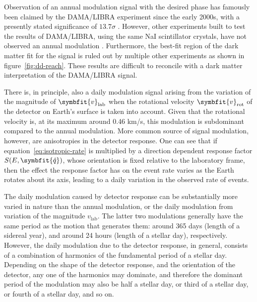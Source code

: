 \documentclass[b5paper, 10pt, twoside]{book}
\renewcommand{\vec}[1]{\symbfit{#1}}
\newcommand{\unitv}[1]{\symbfit{\hat{#1}}}
\begin{document}
Observation of an annual modulation signal with the desired phase has famously been claimed by the DAMA/LIBRA experiment since the early 2000s, with a presently stated significance of $13.7\sigma$ \parencite{BernabeiEtAl2023}. However, other experiments built to test the results of DAMA/LIBRA, using the same NaI scintillator crystals, have not observed an annual modulation \parencites{DMIce2017, COSINE1002019, COSINE1002024, KIMS2019, ANAIS2024}. Furthermore, the best-fit region of the dark matter fit for the signal is ruled out by multiple other experiments as shown in figure~\ref{fig:dd-reach}.  These results are difficult to reconcile with a dark matter interpretation of the DAMA/LIBRA signal.

There is, in principle, also a daily modulation signal arising from the variation of the magnitude of $\vec{v}_\text{lab}$ when the rotational velocity $\vec{v}_\text{rot}$ of the detector on Earth's surface is taken into account. Given that the rotational velocity is, at its maximum around 0.46 km/s, this modulation is subdominant compared to the annual modulation. More common source of signal modulation, however, are anisotropies in the detector response. One can see that if equation~\eqref{eq:isotropic-rate} is multiplied by a direction dependent response factor $S(E,\unitv{q})$, whose orientation is fixed relative to the laboratory frame, then the effect the response factor has on the event rate varies as the Earth rotates about its axis, leading to a daily variation in the observed rate of events.

The daily modulation caused by detector response can be substantially more varied in nature than the annual modulation, or the daily modulation from variation of the magnitude $v_\text{lab}$. The latter two modulations generally have the same period as the motion that generates them: around 365 days (length of a sidereal year), and around 24 hours (length of a stellar day), respectively. However, the daily modulation due to the detector response, in general, consists of a combination of harmonics of the fundamental period of a stellar day. Depending on the shape of the detector response, and the orientation of the detector, any one of the harmonics may dominate, and therefore the dominant period of the modulation may also be half a stellar day, or third of a stellar day, or fourth of a stellar day, and so on.
\end{document}
